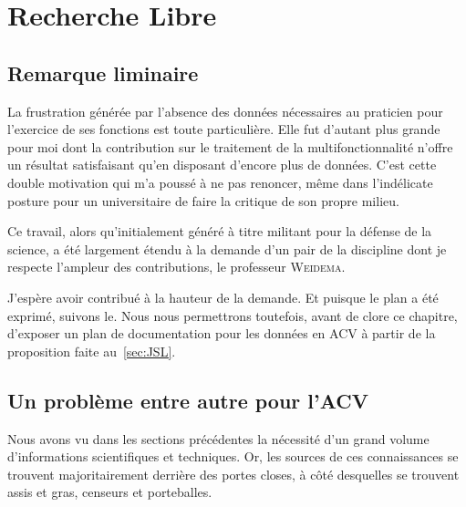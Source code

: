 \chapter{Recherche Libre}
\label{chap:Recherche Libre}
\section{Remarque liminaire}
La frustration générée par l'absence des données nécessaires au praticien pour l'exercice de ses fonctions est toute particulière.
Elle fut d'autant plus grande pour moi dont la contribution sur le traitement de la multifonctionnalité n'offre un résultat satisfaisant qu'en disposant d'encore plus de données.
C'est cette double motivation qui m'a poussé à ne pas renoncer, même dans l'indélicate posture pour un universitaire de faire la critique de son propre milieu.
 
Ce travail, alors qu'initialement généré à titre militant pour la défense de la science, a été largement étendu à la demande d'un pair de la discipline dont je respecte l'ampleur des contributions, le professeur \textsc{Weidema}.


J'espère avoir contribué à la hauteur de la demande.
Et puisque le plan a été exprimé, suivons le.
Nous nous permettrons toutefois, avant de clore ce chapitre, d'exposer un plan de documentation pour les données en ACV à partir de la proposition faite au~\ref{sec:JSL}.

\section{Un problème entre autre pour l'ACV}
Nous avons vu dans les sections précédentes la nécessité d'un grand volume d'informations scientifiques et techniques.
Or, les sources de ces connaissances se trouvent majoritairement derrière des portes closes, à c{\^o}té desquelles se trouvent assis et gras, censeurs et porteballes.


